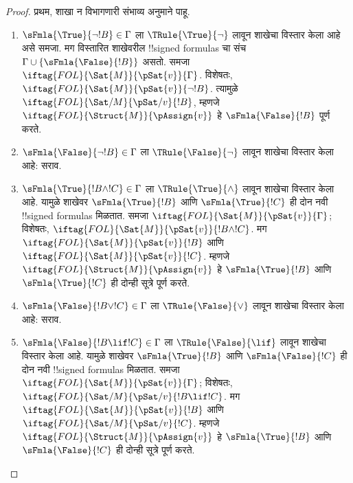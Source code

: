 \documentclass[../../../include/open-logic-section]{subfiles}
\begin{document}
\begin{proof}
प्रथम, शाखा न विभागणारी संभाव्य अनुमाने पाहू.
\begin{enumerate}
\item $\sFmla{\True}{\lnot !B} \in \Gamma$ ला
  $\TRule{\True}{\lnot}$ लावून शाखेचा विस्तार केला आहे असे समजा. मग
  विस्तारित शाखेवरील !!{signed formula}s चा संच $\Gamma \cup
  \{\sFmla{\False}{!B}\}$ असतो. समजा
  $\iftag{FOL}{\Sat{M}}{\pSat{v}}{\Gamma}$. विशेषतः,
  $\iftag{FOL}{\Sat{M}}{\pSat{v}}{\lnot !B}$. त्यामुळे
  $\iftag{FOL}{\Sat/{M}}{\pSat/{v}}{!B}$, म्हणजे
  $\iftag{FOL}{\Struct{M}}{\pAssign{v}}$ हे
  $\sFmla{\False}{!B}$ पूर्ण करते.
\item $\sFmla{\False}{\lnot !B} \in \Gamma$ ला
  $\TRule{\False}{\lnot}$ लावून शाखेचा विस्तार केला आहे: सराव.
\item $\sFmla{\True}{!B \land !C} \in \Gamma$ ला
  $\TRule{\True}{\land}$ लावून शाखेचा विस्तार केला आहे. यामुळे शाखेवर
  $\sFmla{\True}{!B}$ आणि $\sFmla{\True}{!C}$ ही दोन नवी
  !!{signed formula}s मिळतात. समजा
  $\iftag{FOL}{\Sat{M}}{\pSat{v}}{\Gamma}$; विशेषतः,
  $\iftag{FOL}{\Sat{M}}{\pSat{v}}{!B \land !C}$. मग
  $\iftag{FOL}{\Sat{M}}{\pSat{v}}{!B}$ आणि
  $\iftag{FOL}{\Sat{M}}{\pSat{v}}{!C}$. म्हणजे
  $\iftag{FOL}{\Struct{M}}{\pAssign{v}}$ हे
  $\sFmla{\True}{!B}$ आणि $\sFmla{\True}{!C}$ ही दोन्ही सूत्रे पूर्ण करते.
\item $\sFmla{\False}{!B \lor !C} \in \Gamma$ ला
  $\TRule{\False}{\lor}$ लावून शाखेचा विस्तार केला आहे: सराव.
\item $\sFmla{\False}{!B \lif !C} \in \Gamma$ ला
  $\TRule{\False}{\lif}$ लावून शाखेचा विस्तार केला आहे. यामुळे शाखेवर
  $\sFmla{\True}{!B}$ आणि $\sFmla{\False}{!C}$ ही दोन नवी
  !!{signed formula}s मिळतात. समजा
  $\iftag{FOL}{\Sat{M}}{\pSat{v}}{\Gamma}$; विशेषतः,
  $\iftag{FOL}{\Sat/{M}}{\pSat/{v}}{!B \lif !C}$. मग
  $\iftag{FOL}{\Sat{M}}{\pSat{v}}{!B}$ आणि
  $\iftag{FOL}{\Sat/{M}}{\pSat/{v}}{!C}$. म्हणजे
  $\iftag{FOL}{\Struct{M}}{\pAssign{v}}$ हे
  $\sFmla{\True}{!B}$ आणि $\sFmla{\False}{!C}$ ही दोन्ही सूत्रे पूर्ण करते.

\end{enumerate}
\end{proof}
\end{document}

